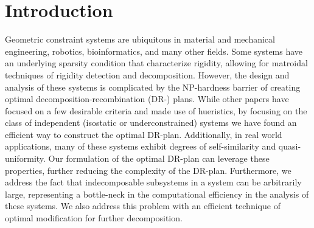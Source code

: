 \section{Introduction}
\label{sec:intro}

\newcommand{\seedefs}{(formally defined in \ref{sec:appendix:defs})}
\newcommand{\seedefsb}{(see \ref{sec:appendix:defs} for definitions)}
\newcommand{\seedefsc}{See \ref{sec:appendix:defs} for formal definitions}
\newcommand{\seedefsd}{see \ref{sec:appendix:defs} for definitions}
\newcommand{\seedefsprelim}{(formally defined in Section \ref{sec:prelim})}





Geometric constraint systems are ubiquitous in material and mechanical engineering, robotics, bioinformatics, and many other fields. Some systems have an underlying sparsity condition that characterize rigidity, allowing for matroidal techniques of rigidity detection and decomposition. However, the design and analysis of these systems is complicated by the NP-hardness barrier of creating optimal decomposition-recombination (DR-) plans. While other papers have focused on a few desirable criteria and made use of hueristics, by focusing on the class of independent (isostatic or underconstrained) systems we have found an efficient way to construct the optimal DR-plan.
Additionally, in real world applications, many of these systems exhibit degrees of self-similarity and quasi-uniformity. Our formulation of the optimal DR-plan can leverage these properties, further reducing the complexity of the DR-plan.
Furthermore, we address the fact that indecomposable subsystems in a system can be arbitrarily large, representing a bottle-neck in the computational efficiency in the analysis of these systems. We also address this problem with an efficient technique of optimal modification for further decomposition.



